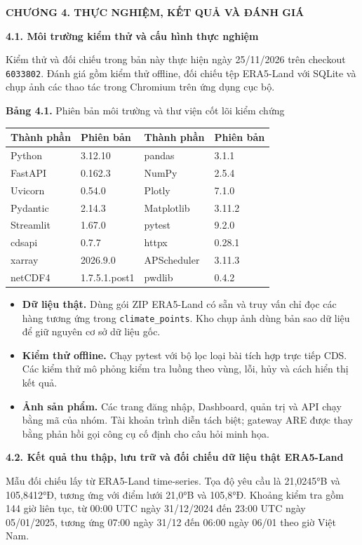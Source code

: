 \documentclass[12pt,a4paper]{article}
\newcommand{\pg}[1]{\newpage\pagenumbering{arabic}\setcounter{page}{#1}\thispagestyle{fancy}}
\newcommand{\heading}[1]{\par\medskip\noindent\textbf{#1}\par\nopagebreak}
\newcommand{\chaptertitle}[1]{\begin{center}\large\bfseries #1\end{center}}
\newcommand{\code}[1]{\texttt{#1}}
\newcommand{\captext}[1]{\begin{center}\small #1\end{center}}
\begin{document}
\pg{27}
\chaptertitle{CHƯƠNG 4. THỰC NGHIỆM, KẾT QUẢ VÀ ĐÁNH GIÁ}
\heading{4.1. Môi trường kiểm thử và cấu hình thực nghiệm}
Kiểm thử và đối chiếu trong bản này thực hiện ngày 25/11/2026 trên checkout \code{6033802}. Đánh giá gồm kiểm thử offline, đối chiếu tệp ERA5-Land với SQLite và chụp ảnh các thao tác trong Chromium trên ứng dụng cục bộ.
\captext{\textbf{Bảng 4.1.} Phiên bản môi trường và thư viện cốt lõi kiểm chứng}
\begin{center}
\begin{tabular}{@{}ll@{\qquad}ll@{}}
\toprule Thành phần & Phiên bản & Thành phần & Phiên bản\\\midrule
Python & 3.12.10 & pandas & 3.1.1\\
FastAPI & 0.162.3 & NumPy & 2.5.4\\
Uvicorn & 0.54.0 & Plotly & 7.1.0\\
Pydantic & 2.14.3 & Matplotlib & 3.11.2\\
Streamlit & 1.67.0 & pytest & 9.2.0\\
cdsapi & 0.7.7 & httpx & 0.28.1\\
xarray & 2026.9.0 & APScheduler & 3.11.3\\
netCDF4 & 1.7.5.1.post1 & pwdlib & 0.4.2\\
\bottomrule
\end{tabular}
\end{center}
\begin{itemize}
\item \textbf{Dữ liệu thật.} Dùng gói ZIP ERA5-Land có sẵn và truy vấn chỉ đọc các hàng tương ứng trong \code{climate\_points}. Kho chụp ảnh dùng bản sao dữ liệu để giữ nguyên cơ sở dữ liệu gốc.
\item \textbf{Kiểm thử offline.} Chạy pytest với bộ lọc loại bài tích hợp trực tiếp CDS. Các kiểm thử mô phỏng kiểm tra luồng theo vùng, lỗi, hủy và cách hiển thị kết quả.
\item \textbf{Ảnh sản phẩm.} Các trang đăng nhập, Dashboard, quản trị và API chạy bằng mã của nhóm. Tài khoản trình diễn tách biệt; gateway ARE được thay bằng phản hồi gọi công cụ cố định cho câu hỏi minh họa.
\end{itemize}
\pg{28}
\heading{4.2. Kết quả thu thập, lưu trữ và đối chiếu dữ liệu thật ERA5-Land}
Mẫu đối chiếu lấy từ ERA5-Land time-series. Tọa độ yêu cầu là 21,0245°B và 105,8412°Đ, tương ứng với điểm lưới 21,0°B và 105,8°Đ. Khoảng kiểm tra gồm 144 giờ liên tục, từ 00:00 UTC ngày 31/12/2024 đến 23:00 UTC ngày 05/01/2025, tương ứng 07:00 ngày 31/12 đến 06:00 ngày 06/01 theo giờ Việt Nam.
 
\end{document}
